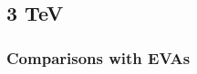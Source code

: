 \documentclass[a4paper,11pt]{article}
\begin{document}
%
%

\clearpage
\subsection{3 TeV}




\clearpage
\subsubsection{Comparisons with EVAs}



\end{document}
